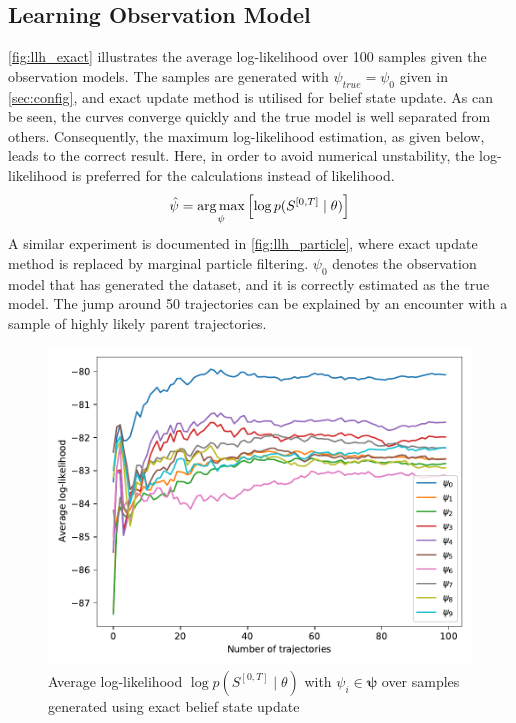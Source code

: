 \subsection{Learning Observation Model}
\autoref{fig:llh_exact} illustrates the average log-likelihood over 100 samples given the observation models. The samples are generated with $ \psi_{true} = \psi_0 $ given in \cref{sec:config}, and exact update method is utilised for belief state update. As can be seen, the curves converge quickly and the true model is well separated from others. Consequently, the maximum log-likelihood estimation, as given below, leads to the correct result. Here, in order to avoid numerical unstability, the log-likelihood is preferred for the calculations instead of likelihood.
\begin{equation}
\hat{\psi} = \operatorname*{arg\,max}_\psi \left[ \log p(S^{[0,T]} \mid \theta )\right] 
\label{eq:max_llh_est}
\end{equation}
A similar experiment is documented in \autoref{fig:llh_particle}, where exact update method is replaced by marginal particle filtering. $ \psi_0 $ denotes the observation model that has generated the dataset, and it is correctly estimated as the true model. The jump around 50 trajectories can be explained by an encounter with a sample of highly likely parent trajectories.
\begin{figure}[H]
	\begin{center}
		\includegraphics[width=.7\textwidth]{figures/roc_analysis/roc_exactUpdate/llh_exactUpdate_psi_0}
		\caption[Average log-likelihood in the case of exact belief update]{Average log-likelihood $ \log p(S^{[0,T]} \mid \theta) $ with $ \psi_i \in \symbf{\psi} $ over samples generated using exact belief state update}
		\label{fig:llh_exact}
	\end{center}
\end{figure}
